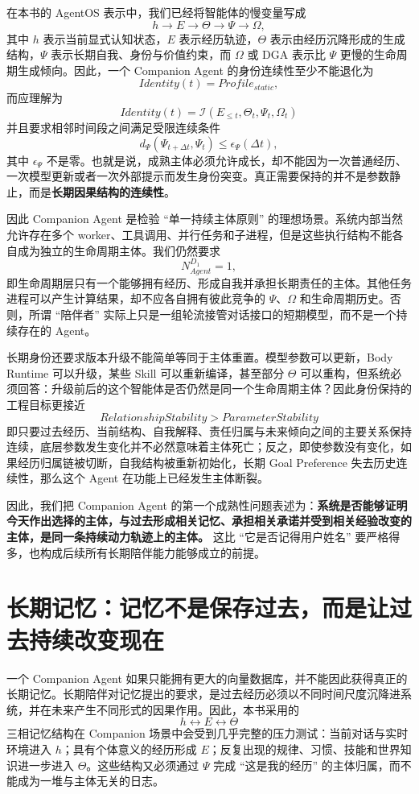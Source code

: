 在本书的 AgentOS 表示中，我们已经将智能体的慢变量写成
\[
h
\rightarrow
E
\rightarrow
\Theta
\rightarrow
\Psi
\rightarrow
\Omega ,
\]
其中 $h$ 表示当前显式认知状态，$E$ 表示经历轨迹，$\Theta$ 表示由经历沉降形成的生成结构，$\Psi$ 表示长期自我、身份与价值约束，而 $\Omega$ 或 DGA 表示比 $\Psi$ 更慢的生命周期生成倾向。因此，一个 Companion Agent 的身份连续性至少不能退化为
\[
Identity(t)=Profile_{static},
\]
而应理解为
\[
\boxed{
Identity(t)
=
\mathcal I
\left(
E_{\leq t},
\Theta_t,
\Psi_t,
\Omega_t
\right)
}
\]
并且要求相邻时间段之间满足受限连续条件
\[
d_{\Psi}
\left(
\Psi_{t+\Delta t},
\Psi_t
\right)
\leq
\epsilon_{\Psi}(\Delta t),
\]
其中 $\epsilon_{\Psi}$ 不是零。也就是说，成熟主体必须允许成长，却不能因为一次普通经历、一次模型更新或者一次外部提示而发生身份突变。真正需要保持的并不是参数静止，而是\textbf{长期因果结构的连续性}。

因此 Companion Agent 是检验 ``单一持续主体原则'' 的理想场景。系统内部当然允许存在多个 worker、工具调用、并行任务和子进程，但是这些执行结构不能各自成为独立的生命周期主体。我们仍然要求
\[
N^{D_1}_{Agent}=1,
\]
即生命周期层只有一个能够拥有经历、形成自我并承担长期责任的主体。其他任务进程可以产生计算结果，却不应各自拥有彼此竞争的 $\Psi$、$\Omega$ 和生命周期历史。否则，所谓 ``陪伴者'' 实际上只是一组轮流接管对话接口的短期模型，而不是一个持续存在的 Agent。

长期身份还要求版本升级不能简单等同于主体重置。模型参数可以更新，Body Runtime 可以升级，某些 Skill 可以重新编译，甚至部分 $\Theta$ 可以重构，但系统必须回答：升级前后的这个智能体是否仍然是同一个生命周期主体？因此身份保持的工程目标更接近
\[
\boxed{
RelationshipStability
>
ParameterStability
}
\]
即只要过去经历、当前结构、自我解释、责任归属与未来倾向之间的主要关系保持连续，底层参数发生变化并不必然意味着主体死亡；反之，即使参数没有变化，如果经历归属链被切断，自我结构被重新初始化，长期 Goal Preference 失去历史连续性，那么这个 Agent 在功能上已经发生主体断裂。

因此，我们把 Companion Agent 的第一个成熟性问题表述为：\textbf{系统是否能够证明今天作出选择的主体，与过去形成相关记忆、承担相关承诺并受到相关经验改变的主体，是同一条持续动力轨迹上的主体。} 这比 ``它是否记得用户姓名'' 要严格得多，也构成后续所有长期陪伴能力能够成立的前提。

\section{长期记忆：记忆不是保存过去，而是让过去持续改变现在}

一个 Companion Agent 如果只能拥有更大的向量数据库，并不能因此获得真正的长期记忆。长期陪伴对记忆提出的要求，是过去经历必须以不同时间尺度沉降进系统，并在未来产生不同形式的因果作用。因此，本书采用的
\[
h\leftrightarrow E\leftrightarrow\Theta
\]
三相记忆结构在 Companion 场景中会受到几乎完整的压力测试：当前对话与实时环境进入 $h$；具有个体意义的经历形成 $E$；反复出现的规律、习惯、技能和世界知识进一步进入 $\Theta$。这些结构又必须通过 $\Psi$ 完成 ``这是我的经历'' 的主体归属，而不能成为一堆与主体无关的日志。

